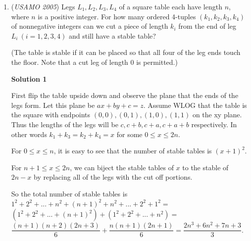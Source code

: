 \begin{enumerate}
 Similarly, the circumcircle of $\triangle APB$ is 
 \[-a^2yz-b^2xz-c^2xy+(x+y+z)a^2pz.\] Now, we substitute $C_1$ into the equation

 
 \[0=-a^2qz'-b^2z'(1-q-z')-c^2q(1-q-z')+a^2pz'=0\]
 \[b^2 z'^2+(a^2p-a^2q-b^2(1-q)+c^2q)z'-c^2q(1-q)=0\]

 Let $k=a^2p-a^2q-b^2(1-q)+c^2q,$ and note that both $y',z'$ are negative. By the quadratic formula, we have
 \[y'=\frac{k-\sqrt{k^2+4b^2c^2q(1-q)}}{2c^2}, z'=\frac{-k-\sqrt{k^2+4b^2c^2q(1-q)}}{2b^2}\]Multiplying these two, we have 
 \[y'z'=\frac{4b^2c^2q(1-q)}{4b^2c^2}=q(1-q),\] as desired. $\blacksquare$
<i>Alternate solutions are always welcome. If you have a different, elegant solution to this problem, please \href{https://artofproblemsolving.com/wiki/index.php?title=2005\_USAMO\_Problems/Problem\_3&action=edit}{add it} to this page.</i>



	\item (\textit{USAMO 2005}) Legs $L_1,L_2,L_3,L_4$ of a square table each have length $n$, where $n$ is a positive integer. For how many ordered 4-tuples $\left(k_1,k_2,k_3,k_4\right)$ of nonnegative integers can we cut a piece of length $k_i$ from the end of leg $L_i\ (i=1,2,3,4)$ and still have a stable table?


 (The table is stable if it can be placed so that all four of the leg ends touch the floor. Note that a cut leg of length 0 is permitted.)


 



\textbf{Solution 1}

First flip the table upside down and observe the plane that the ends of the legs form. Let this plane be $ax+by+c=z$. Assume WLOG that the table is the square with endpoints $(0,0), (0,1), (1,0), (1,1)$ on the xy plane. Thus the lengths of the legs will be $c, c+b, c+a, c+a+b$ respectively. In other words $k_1+k_3=k_2+k_4=x$ for some $0 \le x \le 2n$.

 For $0 \le x \le n$, it is easy to see that the number of stable tables is $(x+1)^2$.

 For $n+1 \le x \le 2n$, we can biject the stable tables of $x$ to the stable of $2n-x$ by replacing all of the legs with the cut off portions.

 So the total number of stable tables is $1^2+2^2+...+n^2+(n+1)^2+n^2+...+2^2+1^2 =$ $(1^2+2^2+...+(n+1)^2)+(1^2+2^2+...+n^2) =$ $\dfrac{(n+1)(n+2)(2n+3)}{6}+\dfrac{n(n+1)(2n+1)}{6}=\boxed{\dfrac{2n^3+6n^2+7n+3}{3}}$.


\end{enumerate}
